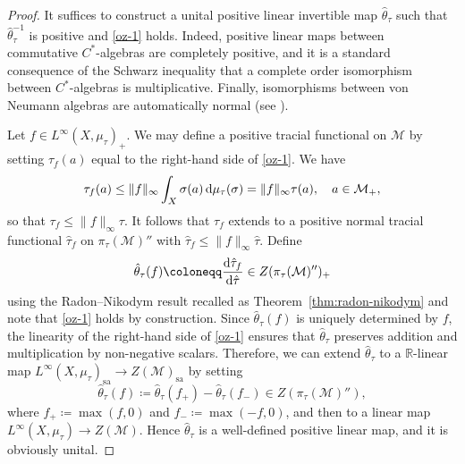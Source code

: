 \documentclass[a4paper,11pt]{amsart}
\theoremstyle{definition}
\numberwithin{equation}{section}
\numberwithin{theorem}{section}
\newcommand{\M}{\mathcal{M}}
\begin{document}
\begin{proof}
    It suffices to construct a unital positive linear invertible map $\hat\theta_\tau$ such that $\hat\theta_\tau^{-1}$ is positive and \eqref{oz-1} holds.  Indeed, positive linear maps between commutative $C^*$-algebras are completely positive, and it is a standard consequence of the Schwarz inequality that a complete order isomorphism between $C^*$-algebras is multiplicative.  Finally, isomorphisms between von Neumann algebras are automatically normal (see \cite[Corollary 1 in Part I, Chapter 4, Section 3]{Di69EngTrans}).

    Let $f \in L^\infty(X, \mu_\tau)_+$.  
    We may define a positive tracial functional on $\M$ by setting $\tau_f(a)$ equal to the right-hand side of \eqref{oz-1}.  We have
    \begin{equation}
  \tau_f(a)\leq \|f\|_\infty\int_X\sigma(a) \,{\rm d}\mu_\tau(\sigma)=\|f\|_\infty\tau(a),\quad a\in \mathcal M_+,
    \end{equation} so that $\tau_f \leq \|f\|_{\infty}\tau$.  It follows that $\tau_f$ extends to a positive normal tracial functional $\hat\tau_f$ on $\pi_\tau(\mathcal M)''$ with  $\hat\tau_f\leq\|f\|_\infty\hat{\tau}$.  Define \begin{equation}
        \hat\theta_\tau(f) \coloneqq \frac{{\rm d} \hat\tau_f}{{\rm d} \hat\tau} \in Z(\pi_\tau(\mathcal M)'')_+
    \end{equation}
 using the Radon--Nikodym result recalled as Theorem~\ref{thm:radon-nikodym} and note that \eqref{oz-1} holds by construction.  Since $\hat\theta_\tau(f)$ is uniquely determined by $f$, the linearity of the right-hand side of \eqref{oz-1} ensures that $\hat\theta_\tau$ preserves addition and multiplication by non-negative scalars. Therefore, we can extend $\hat\theta_\tau$ to a $\mathbb R$-linear map $L^\infty(X, \mu_\tau)_\mathrm{sa} \rightarrow Z(\M)_\mathrm{sa}$ by setting 
    \begin{equation}
        \hat\theta_\tau(f) \coloneqq \hat\theta_\tau(f_+)-\hat\theta_\tau(f_-) \in Z(\pi_\tau(\M)''),
    \end{equation}
    where $f_+ \coloneqq \max(f,0)$ and $f_- \coloneqq \max(-f,0)$, and then to a linear map $L^\infty(X, \mu_\tau) \rightarrow Z(\M)$.
    Hence $\hat\theta_\tau$ is a well-defined positive linear map, and it is obviously unital.


\end{proof}
\end{document}
